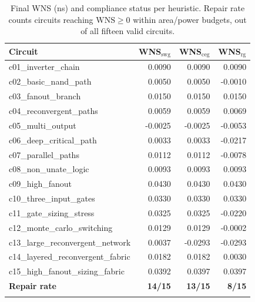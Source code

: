 \begin{center}
\begin{longtable}{@{}lrrr@{}}
\toprule
\textbf{Circuit} & \textbf{WNS$_{\mathrm{swg}}$} & \textbf{WNS$_{\mathrm{ceg}}$} & \textbf{WNS$_{\mathrm{rg}}$} \\
\midrule
\endhead
c01\_inverter\_chain            & \phantom{-}0.0090 & \phantom{-}0.0090 & \phantom{-}0.0090 \\
c02\_basic\_nand\_path          & \phantom{-}0.0050 & \phantom{-}0.0050 & -0.0010  \\
c03\_fanout\_branch             & \phantom{-}0.0150 & \phantom{-}0.0150 & \phantom{-}0.0150 \\
c04\_reconvergent\_paths        & \phantom{-}0.0059 & \phantom{-}0.0059 & \phantom{-}0.0069 \\
c05\_multi\_output              & -0.0025 & -0.0025 & -0.0053 \\
c06\_deep\_critical\_path       & \phantom{-}0.0033 & \phantom{-}0.0033 & -0.0217 \\
c07\_parallel\_paths            & \phantom{-}0.0112 & \phantom{-}0.0112 & -0.0078 \\
c08\_non\_unate\_logic          & \phantom{-}0.0093 & \phantom{-}0.0093 & \phantom{-}0.0093 \\
c09\_high\_fanout               & \phantom{-}0.0430 & \phantom{-}0.0430 & \phantom{-}0.0430 \\
c10\_three\_input\_gates        & \phantom{-}0.0330 & \phantom{-}0.0330 & \phantom{-}0.0330 \\
c11\_gate\_sizing\_stress       & \phantom{-}0.0325 & \phantom{-}0.0325 & -0.0220 \\
c12\_monte\_carlo\_switching    & \phantom{-}0.0129 & \phantom{-}0.0129 & -0.0002 \\
c13\_large\_reconvergent\_network & \phantom{-}0.0037 & -0.0293 & -0.0293 \\
c14\_layered\_reconvergent\_fabric & \phantom{-}0.0182 & \phantom{-}0.0182 & \phantom{-}0.0030 \\
c15\_high\_fanout\_sizing\_fabric & \phantom{-}0.0392 & \phantom{-}0.0397 & \phantom{-}0.0397 \\
\midrule
\textbf{Repair rate} & \textbf{14/15} & \textbf{13/15} & \textbf{8/15} \\
\bottomrule
\caption{Final WNS (ns) and compliance status per heuristic. Repair rate
counts circuits reaching \(\mathrm{WNS} \geq 0\) within area/power
budgets, out of all fifteen valid circuits.}
\label{tab:res-heuristics}
\end{longtable}
\end{center}

